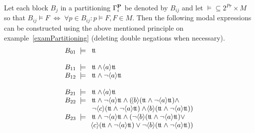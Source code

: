 \begin{example}\label{examPartitioningApply}
Let each block $B_j$ in a partitioning $\Gamma^{\bf P}_i$ be denoted by $B_{ij}$ and let $\models\subseteq 2^{Pr}\times M$ so that $B_{ij} \models F\;\Leftrightarrow\; \forall p\in B_{ij}: p\models F, F\in M$. Then the following modal expressions can be constructed using the above mentioned principle on example~\ref{examPartitioning} (deleting double negations when necessary).
\[
\begin{array}{l@{\;\;}c@{\;\;\;}l}
B_{01} &\models & \dtt\\
\\

B_{11} &\models & \dtt \wedge \can{a}\dtt\\
B_{12} &\models & \dtt \wedge \neg\can{a}\dtt\\
\\

B_{21} &\models & \dtt \wedge \can{a}\dtt\\
B_{22} &\models & \dtt \wedge \neg\can{a}\dtt \wedge(\can{b}(\dtt\wedge\neg\can{a}\dtt)\wedge\\
&&\neg\can{c}(\dtt\wedge\neg\can{a}\dtt)\wedge\can{b}(\dtt\wedge\neg\can{a}\dtt))\\
B_{23} &\models & \dtt \wedge\neg\can{a}\dtt \wedge(\neg\can{b}(\dtt\wedge\neg\can{a}\dtt)\vee\\
&&\can{c}(\dtt\wedge\neg\can{a}\dtt)\vee\neg\can{b}(\dtt\wedge\neg\can{a}\dtt))\\
\\


\end{array}\]
\end{example}
